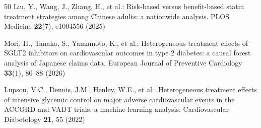 \documentclass[runningheads]{llncs}
\begin{document}
\begin{thebibliography}{50}
Liu, Y., Wang, J., Zhang, H., et al.:
Risk-based versus benefit-based statin treatment strategies
among Chinese adults: a nationwide analysis.
PLOS Medicine \textbf{22}(7), e1004556 (2025)

Mori, H., Tanaka, S., Yamamoto, K., et al.:
Heterogeneous treatment effects of SGLT2 inhibitors on
cardiovascular outcomes in type 2 diabetes: a causal forest
analysis of Japanese claims data.
European Journal of Preventive Cardiology \textbf{33}(1), 80--88 (2026)

Lupson, V.C., Dennis, J.M., Henley, W.E., et al.:
Heterogeneous treatment effects of intensive glycemic control
on major adverse cardiovascular events in the ACCORD and VADT trials:
a machine learning analysis.
Cardiovascular Diabetology \textbf{21}, 55 (2022)

\end{thebibliography}
\end{document}
